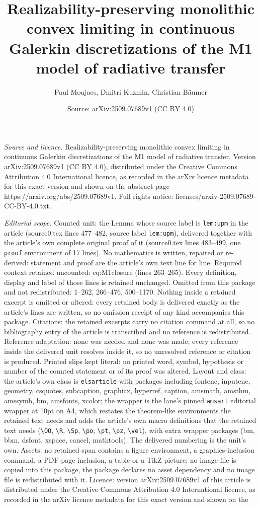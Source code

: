 \documentclass[10pt,a4paper]{amsart}
\title[Realizability-preserving monolithic convex limiting in conti]{Realizability-preserving monolithic convex limiting in continuous Galerkin discretizations of the M1 model of radiative transfer}
\author{Paul Moujaes, Dmitri Kuzmin, Christian B\"aumer}
\date{Source: arXiv:2509.07689v1 (CC BY 4.0)}
\begin{document}
\maketitle

\noindent\emph{Source and licence.} Realizability-preserving monolithic convex limiting in continuous Galerkin discretizations of the M1 model of radiative transfer. Version arXiv:2509.07689v1 (CC BY 4.0), distributed under the Creative Commons Attribution 4.0 International licence, as recorded in the arXiv licence metadata for this exact version and shown on the abstract page https://arxiv.org/abs/2509.07689v1. Full rights notice: licenses/arxiv-2509.07689-CC-BY-4.0.txt.\par\smallskip

\noindent\textit{Editorial scope.} Counted unit: the Lemma whose source label is \texttt{lem:upm} in the article (source0.tex lines 477--482, source label \texttt{lem:upm}), delivered together with the article's own complete original proof of it (source0.tex lines 483--499, one \texttt{proof} environment of 17 lines). No mathematics is written, repaired or re-derived: statement and proof are the article's own text line for line. Required context retained uncounted: eq:M1closure (lines 263--265). Every definition, display and label of those lines is retained unchanged. Omitted from this package and not redistributed: 1--262, 266--476, 500--1170. Nothing inside a retained excerpt is omitted or altered: every retained body is delivered exactly as the article's lines are written, so no omission receipt of any kind accompanies this package. Citations: the retained excerpts carry no citation command at all, so no bibliography entry of the article is transcribed and no reference is redistributed. Reference adaptation: none was needed and none was made; every reference inside the delivered unit resolves inside it, so no unresolved reference or citation is produced. Printed slips kept literal: no printed word, symbol, hypothesis or number of the counted statement or of its proof was altered. Layout and class: the article's own class is \texttt{elsarticle} with packages including fontenc, inputenc, geometry, csquotes, subcaption, graphicx, hyperref, caption, amsmath, amsthm, amssymb, bm, amsfonts, xcolor; the wrapper is the lane's pinned \texttt{amsart} editorial wrapper at 10pt on A4, which restates the theorem-like environments the retained text needs and adds the article's own macro definitions that the retained text needs (\texttt{\textbackslash OO}, \texttt{\textbackslash R}, \texttt{\textbackslash Sp}, \texttt{\textbackslash po}, \texttt{\textbackslash pt}, \texttt{\textbackslash pz}, \texttt{\textbackslash vel}), with extra wrapper packages (bm, bbm, dsfont, xspace, cancel, mathtools). The delivered numbering is the unit's own. Assets: no retained span contains a figure environment, a graphics-inclusion command, a PDF-page inclusion, a table or a TikZ picture; no image file is copied into this package, the package declares no asset dependency and no image file is redistributed with it. Licence: version arXiv:2509.07689v1 of this article is distributed under the Creative Commons Attribution 4.0 International licence, as recorded in the arXiv licence metadata for this exact version and shown on the 
\end{document}
